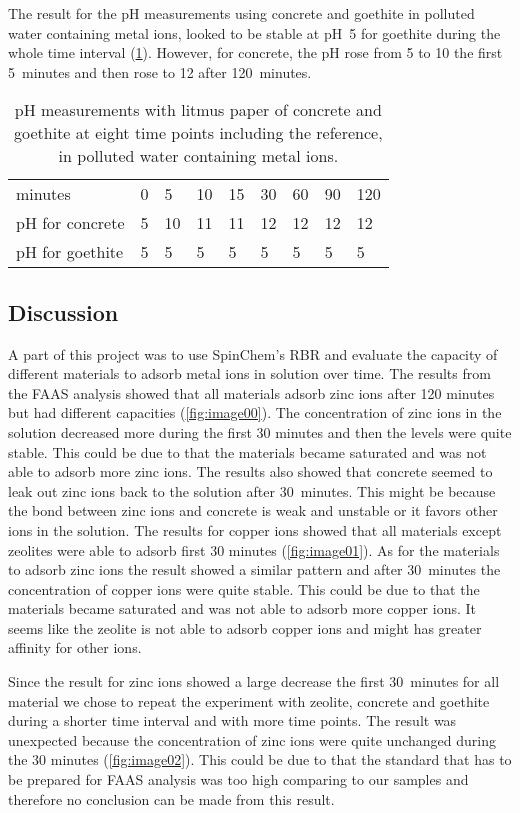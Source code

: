 The result for the pH measurements using concrete and goethite in polluted water containing metal ions, looked to be stable at pH~5 for goethite during the whole time interval (\cref{tab:ph}). However, for concrete, the pH rose from 5 to 10 the first 5~minutes and then rose to 12 after 120~minutes. 

\begin{table}[H]
\centering
\caption{pH measurements with litmus paper of concrete and goethite at eight time points including the reference, in polluted water containing metal ions.}
\label{tab:ph}
\begin{tabular}{lllllllll}
minutes         & 0 & 5 & 10 & 15 & 30 & 60 & 90 & 120 \\
pH for concrete & 5 & 10 & 11 & 11 & 12 & 12 & 12 & 12 \\
pH for goethite & 5 & 5 & 5 & 5 & 5 & 5 & 5 & 5
\end{tabular}
\end{table}

\subsection{Discussion}
A part of this project was to use SpinChem\textsuperscript{\textregistered}'s RBR and evaluate the capacity of different materials to adsorb metal ions in solution over time. The results from the FAAS analysis showed that all materials adsorb zinc ions after 120 minutes but had different capacities (\cref{fig:image00}). The concentration of zinc ions in the solution decreased more during the first 30 minutes and then the levels were quite stable. This could be due to that the materials became saturated and was not able to adsorb more zinc ions. The results also showed that concrete seemed to leak out zinc ions back to the solution after 30~minutes. This might be because the bond between zinc ions and concrete is weak and unstable or it favors other ions in the solution. The results for copper ions showed that all materials except zeolites were able to adsorb first 30 minutes (\cref{fig:image01}). As for the materials to adsorb zinc ions the result showed a similar pattern and after 30~minutes the concentration of copper ions were quite stable. This could be due to that the materials became saturated and was not able to adsorb more copper ions. It seems like the zeolite is not able to adsorb copper ions and might has greater affinity for other ions. 

Since the result for zinc ions showed a large decrease the first 30~minutes for all material we chose to repeat the experiment with zeolite, concrete and goethite during a shorter time interval and with more time points. The result was unexpected because the concentration of zinc ions were quite unchanged during the 30 minutes (\cref{fig:image02}). This could be due to that the standard that has to be prepared for FAAS analysis was too high comparing to our samples and therefore no conclusion can be made from this result. 

